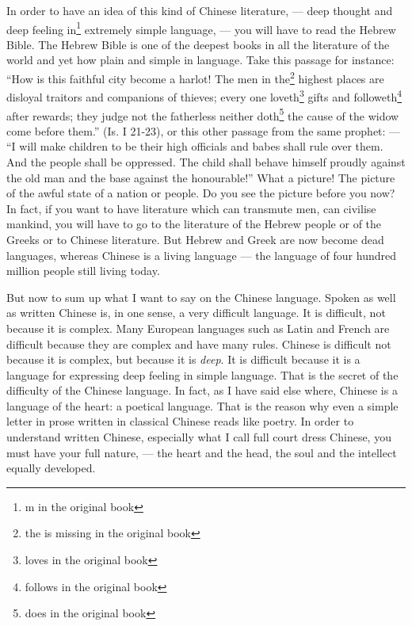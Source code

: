 In order to have an idea of this kind of Chinese literature, --- deep thought and deep feeling in\footnote{m in the original book} extremely simple language, --- you will have to read the Hebrew Bible.
The Hebrew Bible is one of the deepest books in all the literature of the world and yet how plain and simple in language.
Take this passage for instance: ``How is this faithful city become a harlot!
The men in the\footnote{the is missing in the original book} highest places are disloyal traitors and companions of thieves;
every one loveth\footnote{loves in the original book} gifts and followeth\footnote{follows in the original book} after rewards;
they judge not the fatherless neither doth\footnote{does in the original book} the cause of the widow come before them.'' 
(Is. I 21-23), or this other passage from the same prophet: --- ``I will make children to be their high officials and babes shall rule over them. And the people shall be oppressed. The child shall behave himself proudly against the old man and the base against the honourable!''
What a picture! The picture of the awful state of a nation or people.
Do you see the picture before you now?
In fact, if you want to have literature which can transmute men, can civilise mankind, you will have to go to the literature of the Hebrew people or of the Greeks or to Chinese literature.
But Hebrew and Greek are now become dead languages, whereas Chinese is a living language --- the language of four hundred million people still living today.

But now to sum up what I want to say on the Chinese language.
Spoken as well as written Chinese is, in one sense, a very difficult language.
It is difficult, not because it is complex.
Many European languages such as Latin and French are difficult because they are complex and have many rules.
Chinese is difficult not because it is complex, but because it is \emph{deep}.
It is difficult because it is a language for expressing deep feeling in simple language.
That is the secret of the difficulty of the Chinese language.
In fact, as I have said else where, Chinese is a language of the heart: a poetical language.
That is the reason why even a simple letter in prose written in classical Chinese reads like poetry.
In order to understand written Chinese, especially what I call full court dress Chinese, you must have your full nature, --- the heart and the head, the soul and the intellect equally developed.

